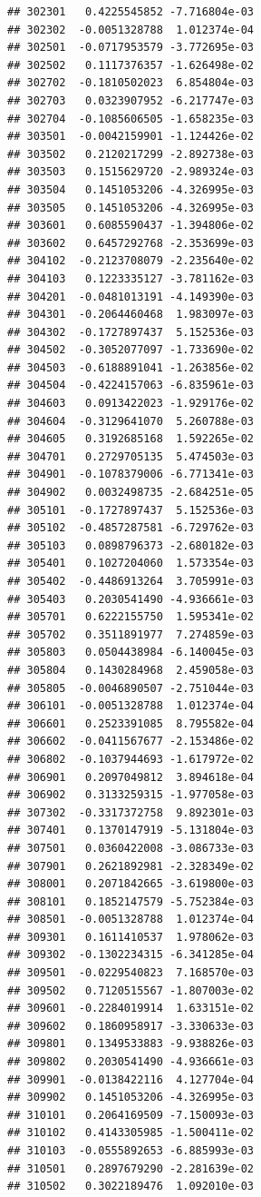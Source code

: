 \begin{frame}[fragile]
\begin{verbatim}
## 302301   0.4225545852 -7.716804e-03
## 302302  -0.0051328788  1.012374e-04
## 302501  -0.0717953579 -3.772695e-03
## 302502   0.1117376357 -1.626498e-02
## 302702  -0.1810502023  6.854804e-03
## 302703   0.0323907952 -6.217747e-03
## 302704  -0.1085606505 -1.658235e-03
## 303501  -0.0042159901 -1.124426e-02
## 303502   0.2120217299 -2.892738e-03
## 303503   0.1515629720 -2.989324e-03
## 303504   0.1451053206 -4.326995e-03
## 303505   0.1451053206 -4.326995e-03
## 303601   0.6085590437 -1.394806e-02
## 303602   0.6457292768 -2.353699e-03
## 304102  -0.2123708079 -2.235640e-02
## 304103   0.1223335127 -3.781162e-03
## 304201  -0.0481013191 -4.149390e-03
## 304301  -0.2064460468  1.983097e-03
## 304302  -0.1727897437  5.152536e-03
## 304502  -0.3052077097 -1.733690e-02
## 304503  -0.6188891041 -1.263856e-02
## 304504  -0.4224157063 -6.835961e-03
## 304603   0.0913422023 -1.929176e-02
## 304604  -0.3129641070  5.260788e-03
## 304605   0.3192685168  1.592265e-02
## 304701   0.2729705135  5.474503e-03
## 304901  -0.1078379006 -6.771341e-03
## 304902   0.0032498735 -2.684251e-05
## 305101  -0.1727897437  5.152536e-03
## 305102  -0.4857287581 -6.729762e-03
## 305103   0.0898796373 -2.680182e-03
## 305401   0.1027204060  1.573354e-03
## 305402  -0.4486913264  3.705991e-03
## 305403   0.2030541490 -4.936661e-03
## 305701   0.6222155750  1.595341e-02
## 305702   0.3511891977  7.274859e-03
## 305803   0.0504438984 -6.140045e-03
## 305804   0.1430284968  2.459058e-03
## 305805  -0.0046890507 -2.751044e-03
## 306101  -0.0051328788  1.012374e-04
## 306601   0.2523391085  8.795582e-04
## 306602  -0.0411567677 -2.153486e-02
## 306802  -0.1037944693 -1.617972e-02
## 306901   0.2097049812  3.894618e-04
## 306902   0.3133259315 -1.977058e-03
## 307302  -0.3317372758  9.892301e-03
## 307401   0.1370147919 -5.131804e-03
## 307501   0.0360422008 -3.086733e-03
## 307901   0.2621892981 -2.328349e-02
## 308001   0.2071842665 -3.619800e-03
## 308101   0.1852147579 -5.752384e-03
## 308501  -0.0051328788  1.012374e-04
## 309301   0.1611410537  1.978062e-03
## 309302  -0.1302234315 -6.341285e-04
## 309501  -0.0229540823  7.168570e-03
## 309502   0.7120515567 -1.807003e-02
## 309601  -0.2284019914  1.633151e-02
## 309602   0.1860958917 -3.330633e-03
## 309801   0.1349533883 -9.938826e-03
## 309802   0.2030541490 -4.936661e-03
## 309901  -0.0138422116  4.127704e-04
## 309902   0.1451053206 -4.326995e-03
## 310101   0.2064169509 -7.150093e-03
## 310102   0.4143305985 -1.500411e-02
## 310103  -0.0555892653 -6.885993e-03
## 310501   0.2897679290 -2.281639e-02
## 310502   0.3022189476  1.092010e-03

\end{verbatim}
\end{frame}
